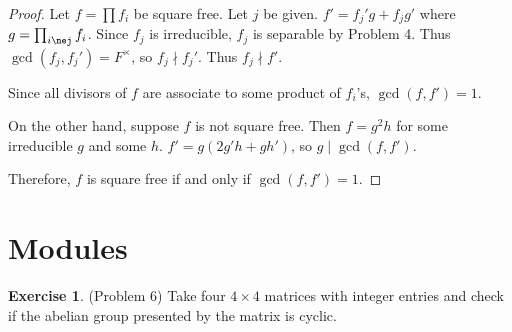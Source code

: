 \documentclass[12pt, psamsfonts]{amsart}
\theoremstyle{definition}
\newtheorem*{exer}{Exercise}
\theoremstyle{remark}
\numberwithin{equation}{section}
\begin{document}
\begin{proof}
  Let $f = \prod f_i$ be square free.
  Let $j$ be given.
  $f' = f_j'g + f_jg'$ where $g = \prod_{i\nej} f_i$.
  Since $f_j$ is irreducible, $f_j$ is separable by Problem 4.
  Thus $\gcd(f_j, f_j') = F^{\times}$, so $f_j \nmid f_j'$.
  Thus $f_j \nmid f'$.

  Since all divisors of $f$ are associate to some product of $f_i$'s, $\gcd(f, f') = 1$.

  On the other hand, suppose $f$ is not square free.
  Then $f = g^2h$ for some irreducible $g$ and some $h$.
  $f' = g(2g'h + gh')$, so $g \mid \gcd(f, f')$.

  Therefore, $f$ is square free if and only if $\gcd(f, f') = 1$.
\end{proof}

\section{Modules}

\begin{exer}{(Problem 6)}
  Take four $4 \times 4$ matrices with integer entries and check if the abelian group presented by the matrix is cyclic.
\end{exer}
\end{document}
